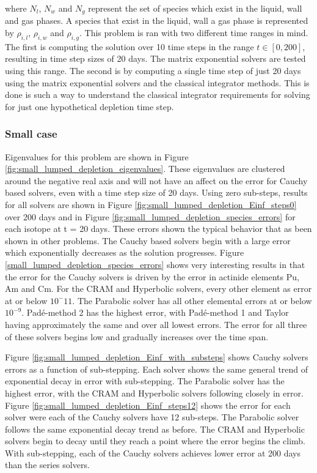 \noindent where $N_{l}$, $N_{w}$ and $N_{g}$ represent the set of species which exist in the liquid, wall and gas phases. A species that exist in the liquid, wall a gas phase is represented by $\rho_{i,l}$, $\rho_{i,w}$ and $\rho_{i,g}$.  This problem is ran with two different time ranges in mind. The first is computing the solution over 10 time steps in the range $t \in [0, 200]$, resulting in time step sizes of 20 days. The matrix exponential solvers are tested using this range. The second is by computing a single time step of just 20 days using the matrix exponential solvers and the classical integrator methods. This is done is such a way to understand the classical integrator requirements for solving for just one hypothetical depletion time step. 

\subsubsection{Small case}
Eigenvalues for this problem are shown in Figure \ref{fig:small_lumped_depletion_eigenvalues}. These eigenvalues are clustered around the negative real axis and will not have an affect on the error for Cauchy based solvers, even with a time step size of 20 days. Using zero sub-steps, results for all solvers are shown in Figure \ref{fig:small_lumped_depletion_Einf_steps0} over 200 days and in Figure \ref{fig:small_lumped_depletion_species_errors} for each isotope at t = 20 days. These errors shown the typical behavior that as been shown in other problems. The Cauchy based solvers begin with a large error which exponentially decreases as the solution progresses. Figure \ref{small_lumped_depletion_species_errors} shows very interesting results in that the error for the Cauchy solvers is driven by the error in actinide elements Pu, Am and Cm. For the CRAM and Hyperbolic solvers, every other element as error at or below $10^-{11}$. The Parabolic solver has all other elemental errors at or below $10^{-9}$. Pad\'e-method 2 has the highest error, with Pad\'e-method 1 and Taylor having approximately the same and over all lowest errors. The error for all three of these solvers begins low and gradually increases over the time span. 

Figure \ref{fig:small_lumped_depletion_Einf_with_substeps} shows Cauchy solvers errors as a function of sub-stepping. Each solver shows the same general trend of exponential decay in error with sub-stepping. The Parabolic solver has the highest error, with the CRAM and Hyperbolic solvers following closely in error. Figure \ref{fig:small_lumped_depletion_Einf_steps12} shows the error for each solver were each of the Cauchy solvers have 12 sub-steps. The Parabolic solver follows the same exponential decay trend as before. The CRAM and Hyperbolic solvers begin to decay until they reach a point where the error begins the climb. With sub-stepping, each of the Cauchy solvers achieves lower error at 200 days than the series solvers. 

